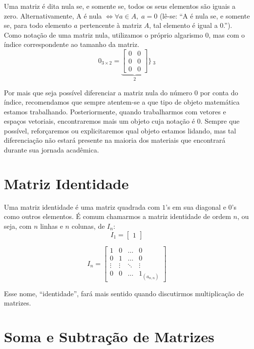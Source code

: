 \documentclass[
  portuguese,
  letterpaper,
  DIV=11,
  numbers=noendperiod]{scrreport}
\begin{document}
Uma matriz é dita nula se, e somente se, todos os seus elementos são
iguais a zero. Alternativamente, A é nula
\(\Leftrightarrow \forall a \in A, \; a = 0\) (lê-se: ``A é nula se, e
somente se, para todo elemento \(a\) pertencente à matriz \(A\), tal
elemento é igual a \(0\).''). Como notação de uma matriz nula,
utilizamos o próprio algarismo 0, mas com o índice correspondente ao
tamanho da matriz. \[
0_{3\times 2}=
\underbrace{\begin{bmatrix}
    0 & 0  \\
    0 & 0  \\
    0 & 0
\end{bmatrix}}_{2}\Bigg\} ~_{3}
\]

Por mais que seja possível diferenciar a matriz nula do número \(0\) por
conta do índice, recomendamos que sempre atentem-se a que tipo de objeto
matemática estamos trabalhando. Posteriormente, quando trabalharmos com
vetores e espaços vetoriais, encontraremos mais um objeto cuja notação é
\(0\). Sempre que possível, reforçaremos ou explicitaremos qual objeto
estamos lidando, mas tal diferenciação não estará presente na maioria
dos materiais que encontrará durante sua jornada acadêmica.

\section{Matriz Identidade}\label{matriz-identidade}

Uma matriz identidade é uma matriz quadrada com \(1\)'s em sua diagonal
e \(0\)'s como outros elementos. É comum chamarmos a matriz identidade
de ordem \(n\), ou seja, com \(n\) linhas e \(n\) colunas, de \(I_n\):
\[
I_{1} = 
\begin{bmatrix}
1
\end{bmatrix}
\]

\[
I_{n} =
\begin{bmatrix}
    1 & 0 & \dots & 0 \\
    0 & 1 & \dots & 0 \\
    \vdots  & \vdots & \ddots & \vdots \\
    0 & 0 & \dots & 1_{(a_{n,n})}
\end{bmatrix}
\]

Esse nome, ``identidade'', fará mais sentido quando discutirmos
multiplicação de matrizes.

\section{Soma e Subtração de
Matrizes}\label{soma-e-subtrauxe7uxe3o-de-matrizes}
\end{document}
